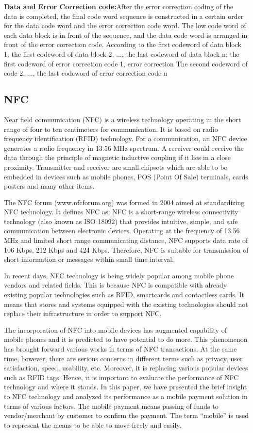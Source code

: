 \documentclass[journal]{IEEEtran}
\begin{document}
\textbf{Data and Error Correction code:}After the error correction coding of the data is completed, the final code word sequence is constructed in a certain order for the data code word and the error correction code word. The low code word of each data block is in front of the sequence, and the data code word is arranged in front of the error correction code. According to the first codeword of data block 1, the first codeword of data block 2, ..., the last codeword of data block n; the first codeword of error correction code 1, error correction The second codeword of code 2, ..., the last codeword of error correction code n


\subsection{NFC}
Near field communication (NFC) is a wireless technology operating in the short range of four to ten centimeters for communication. It is based on radio frequency identification (RFID) technology. For a communication, an NFC device generates a radio frequency in 13.56 MHz spectrum. A receiver could receive the data through the principle of magnetic inductive coupling if it lies in a close proximity. Transmitter and receiver are small chipsets which are able to be embedded in devices such as mobile phones, POS (Point Of Sale) terminals, cards posters and many other items. 

The NFC forum (www.nfcforum.org) was formed in 2004 aimed at standardizing NFC technology. It defines NFC as: NFC is a short-range wireless connectivity technology (also known as ISO 18092) that provides intuitive, simple, and safe communication between electronic devices. Operating at the frequency of 13.56 MHz and limited short range communicating distance, NFC supports data rate of 106 Kbps, 212 Kbps and 424 Kbps. Therefore, NFC is suitable for transmission of short information or messages within small time interval. 

In recent days, NFC technology is being widely popular among mobile phone vendors and related fields. This is because NFC is compatible with already existing popular technologies such as RFID, smartcards and contactless cards. It means that stores and systems equipped with the existing technologies should not replace their infrastructure in order to support NFC. 

The incorporation of NFC into mobile devices has augmented capability of mobile phones and it is predicted to have potential to do more. This phenomenon has brought forward various works in terms of NFC transactions. At the same time, however, there are serious concerns in different terms such as privacy, user satisfaction, speed, usability, etc. Moreover, it is replacing various popular devices such as RFID tags. Hence, it is important to evaluate the performance of NFC technology and where it stands. In this paper, we have presented the brief insight to NFC technology and analyzed its performance as a mobile payment solution in terms of various factors. The mobile payment means passing of funds to vendor/merchant by customer to confirm the payment. The term “mobile” is used to represent the means to be able to move freely and easily.
\end{document}
